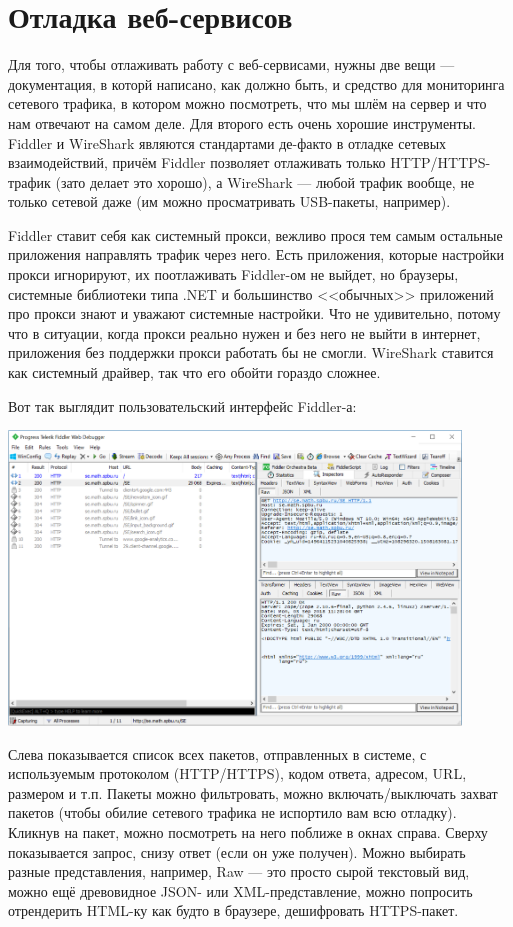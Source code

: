 \documentclass{../../text-style}
\begin{document}
\section{Отладка веб-сервисов}

Для того, чтобы отлаживать работу с веб-сервисами, нужны две вещи --- документация, в которй написано, как должно быть, и средство для мониторинга сетевого трафика, в котором можно посмотреть, что мы шлём на сервер и что нам отвечают на самом деле. Для второго есть очень хорошие инструменты. Fiddler и WireShark являются стандартами де-факто в отладке сетевых взаимодействий, причём Fiddler позволяет отлаживать только HTTP/HTTPS-трафик (зато делает это хорошо), а WireShark --- любой трафик вообще, не только сетевой даже (им можно просматривать USB-пакеты, например). 

Fiddler ставит себя как системный прокси, вежливо прося тем самым остальные приложения направлять трафик через него. Есть приложения, которые настройки прокси игнорируют, их поотлаживать Fiddler-ом не выйдет, но браузеры, системные библиотеки типа .NET и большинство <<обычных>> приложений про прокси знают и уважают системные настройки. Что не удивительно, потому что в ситуации, когда прокси реально нужен и без него не выйти в интернет, приложения без поддержки прокси работать бы не смогли. WireShark ставится как системный драйвер, так что его обойти гораздо сложнее.

Вот так выглядит пользовательский интерфейс Fiddler-а:

\begin{center}
    \includegraphics[width=0.9\textwidth]{fiddler.png}
\end{center}

Слева показывается список всех пакетов, отправленных в системе, с используемым протоколом (HTTP/HTTPS), кодом ответа, адресом, URL, размером и т.п. Пакеты можно фильтровать, можно включать/выключать захват пакетов (чтобы обилие сетевого трафика не испортило вам всю отладку). Кликнув на пакет, можно посмотреть на него поближе в окнах справа. Сверху показывается запрос, снизу ответ (если он уже получен). Можно выбирать разные представления, например, Raw --- это просто сырой текстовый вид, можно ещё древовидное JSON- или XML-представление, можно попросить отрендерить HTML-ку как будто в браузере, дешифровать HTTPS-пакет. 
\end{document}
